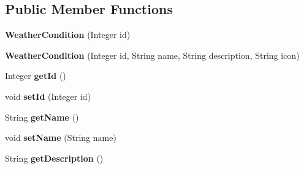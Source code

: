 \subsection*{Public Member Functions}
\begin{DoxyCompactItemize}
\item 
\hypertarget{classit_1_1polimi_1_1se_1_1calcare_1_1entities_1_1WeatherCondition_a00c0cd171da722b3ad7c585705fa4e95}{}{\bfseries Weather\+Condition} (Integer id)\label{classit_1_1polimi_1_1se_1_1calcare_1_1entities_1_1WeatherCondition_a00c0cd171da722b3ad7c585705fa4e95}

\item 
\hypertarget{classit_1_1polimi_1_1se_1_1calcare_1_1entities_1_1WeatherCondition_a6db94d45467b640b16941f53cea5c4d7}{}{\bfseries Weather\+Condition} (Integer id, String name, String description, String icon)\label{classit_1_1polimi_1_1se_1_1calcare_1_1entities_1_1WeatherCondition_a6db94d45467b640b16941f53cea5c4d7}

\item 
\hypertarget{classit_1_1polimi_1_1se_1_1calcare_1_1entities_1_1WeatherCondition_a0435cf83fe43e4c1f91dc3c4a67372f0}{}Integer {\bfseries get\+Id} ()\label{classit_1_1polimi_1_1se_1_1calcare_1_1entities_1_1WeatherCondition_a0435cf83fe43e4c1f91dc3c4a67372f0}

\item 
\hypertarget{classit_1_1polimi_1_1se_1_1calcare_1_1entities_1_1WeatherCondition_ada713c8b3183d7dbc784c65137cc134e}{}void {\bfseries set\+Id} (Integer id)\label{classit_1_1polimi_1_1se_1_1calcare_1_1entities_1_1WeatherCondition_ada713c8b3183d7dbc784c65137cc134e}

\item 
\hypertarget{classit_1_1polimi_1_1se_1_1calcare_1_1entities_1_1WeatherCondition_a36a94e78f944d906c209d2496f36f3b3}{}String {\bfseries get\+Name} ()\label{classit_1_1polimi_1_1se_1_1calcare_1_1entities_1_1WeatherCondition_a36a94e78f944d906c209d2496f36f3b3}

\item 
\hypertarget{classit_1_1polimi_1_1se_1_1calcare_1_1entities_1_1WeatherCondition_a0f72cbdc034995e9f3d49f51c7481cfd}{}void {\bfseries set\+Name} (String name)\label{classit_1_1polimi_1_1se_1_1calcare_1_1entities_1_1WeatherCondition_a0f72cbdc034995e9f3d49f51c7481cfd}

\item 
\hypertarget{classit_1_1polimi_1_1se_1_1calcare_1_1entities_1_1WeatherCondition_afdd95174d07504c843bb04fbc58babd5}{}String {\bfseries get\+Description} ()\label{classit_1_1polimi_1_1se_1_1calcare_1_1entities_1_1WeatherCondition_afdd95174d07504c843bb04fbc58babd5}


\end{DoxyCompactItemize}
